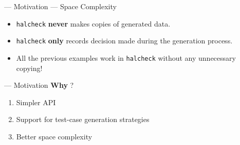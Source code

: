 \begin{frame}{\halcheck{} --- Motivation --- Space Complexity}
  \begin{itemize}
    \item \texttt{halcheck} \textbf{never} makes copies of generated data.
    \item \texttt{halcheck} \textbf{only} records decision made during the generation process.
    \item All the previous examples work in \texttt{halcheck} without any unnecessary copying!
  \end{itemize}
\end{frame}

\begin{frame}{\halcheck{} --- Motivation}
  \textbf{Why} \halcheck{}?

  \begin{enumerate}
    \item Simpler API
    \item Support for test-case generation strategies
    \item Better space complexity
  \end{enumerate}
\end{frame}
